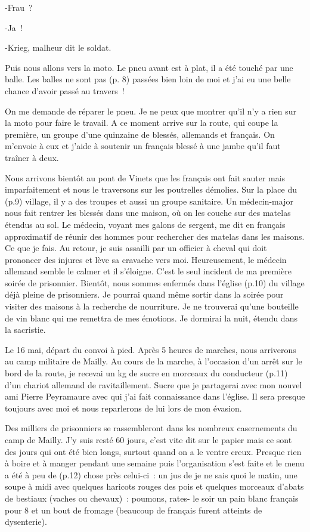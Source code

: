 \documentclass[a5paper,pagesize,10pt,bibtotoc,pointlessnumbers,
normalheadings,DIV=9,twoside=false]{scrbook}
\begin{document}
	-Frau ? 
	
	-Ja ! 
	
	-Krieg, malheur dit le soldat.
	
	Puis nous allons vers la moto. Le pneu avant est à plat, il a été touché par une balle. Les balles ne sont pas (p. 8) passées bien loin de moi et j’ai eu une belle chance d’avoir passé au travers !
	
	On me demande de réparer le pneu. Je ne peux que montrer qu’il n’y a rien sur la moto pour faire le travail. A ce moment arrive sur la route, qui coupe la première, un groupe d’une quinzaine de blessés, allemands et français. On m’envoie à eux et j’aide à soutenir un français blessé à une jambe qu’il faut traîner à deux. 
	
	Nous arrivons bientôt au pont de Vinets que les français ont fait sauter mais imparfaitement et nous le traversons sur les poutrelles démolies. Sur la place du (p.9) village, il y a des troupes et aussi un groupe sanitaire. Un médecin-major nous fait rentrer les blessés dans une maison, où on les couche sur des matelas étendus au sol. Le médecin, voyant mes galons de sergent, me dit en français approximatif de réunir des hommes pour rechercher des matelas dans les maisons. Ce que je fais. Au retour, je suis assailli par un officier à cheval qui doit prononcer des injures et lève sa cravache vers moi. Heureusement, le médecin allemand semble le calmer et il s’éloigne. C’est le seul incident de ma première soirée de prisonnier. Bientôt, nous sommes enfermés dans l’église (p.10) du village déjà pleine de prisonniers. Je pourrai quand même sortir dans la soirée pour visiter des maisons à la recherche de nourriture. Je ne trouverai qu’une bouteille de vin blanc qui me remettra de mes émotions. Je dormirai la nuit, étendu dans la sacristie.
	
	Le 16 mai, départ du convoi à pied. Après 5 heures de marches, nous arriverons au camp militaire de  Mailly. Au cours de la marche, à l’occasion d’un arrêt sur le bord de la route, je recevai un kg de sucre en morceaux du conducteur (p.11) d’un chariot allemand de ravitaillement. Sucre que je partagerai avec mon nouvel ami Pierre Peyramaure avec qui j’ai fait connaissance dans l’église. Il sera presque toujours avec moi et nous reparlerons de lui lors de mon évasion.
	
	Des milliers de prisonniers se rassembleront dans les nombreux casernements du camp de Mailly. J’y suis resté 60 jours, c’est vite dit sur le papier mais ce sont des jours qui ont été bien longs, surtout quand on a le ventre creux. Presque rien à boire et à manger pendant une semaine puis l’organisation s’est faite et le menu a été à peu de (p.12) chose près celui-ci : un jus de je ne sais quoi le matin, une soupe à midi avec quelques haricots rouges des pois et quelques morceaux d’abats de bestiaux (vaches ou chevaux) : poumons, rates- le soir un pain blanc français pour 8 et un bout de fromage (beaucoup de français furent atteints de dysenterie).
	
\end{document}
